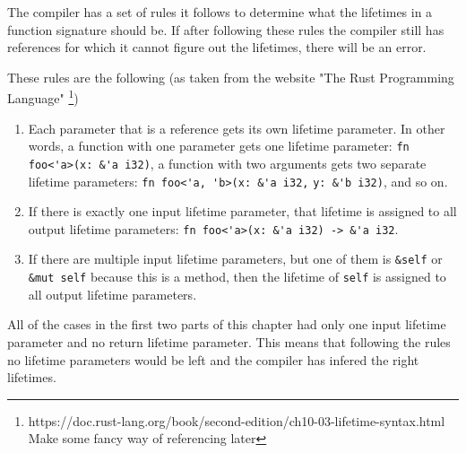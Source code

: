 The compiler has a set of rules it follows to determine what the lifetimes in a function signature should be. If after following these rules the compiler still has references for which it cannot figure out the lifetimes, there will be an error. 

These rules are the following (as taken from the website "The Rust Programming Language" \footnote{https://doc.rust-lang.org/book/second-edition/ch10-03-lifetime-syntax.html Make some fancy way of referencing later})

\begin{enumerate}[noitemsep]
    \item Each parameter that is a reference gets its own lifetime parameter. In other words, a function with one parameter gets one lifetime parameter: \verb|fn foo<'a>(x: &'a i32)|, a function with two arguments gets two separate lifetime parameters: \verb|fn foo<'a, 'b>(x: &'a i32,| \verb|y: &'b i32)|, and so on.
\item If there is exactly one input lifetime parameter, that lifetime is assigned to all output lifetime parameters: \verb|fn foo<'a>(x: &'a i32) -> &'a i32|.
\item If there are multiple input lifetime parameters, but one of them is \verb|&self| or \verb|&mut self| because this is a method, then the lifetime of \verb|self| is assigned to all output lifetime parameters.
\end{enumerate}

All of the cases in the first two parts of this chapter had only one input lifetime parameter and no return lifetime parameter. This means that following the rules no lifetime parameters would be left and the compiler has infered the right lifetimes. 



%    

